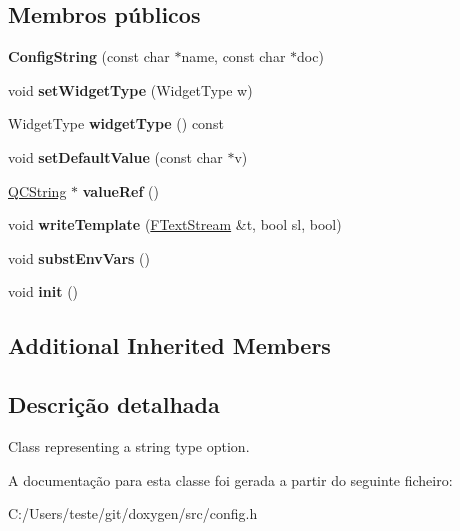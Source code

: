 \subsection*{Membros públicos}
\begin{DoxyCompactItemize}
\item 
\hypertarget{class_config_string_af3cba8358c7cc00c53cfb032b847bff2}{{\bfseries Config\-String} (const char $\ast$name, const char $\ast$doc)}\label{class_config_string_af3cba8358c7cc00c53cfb032b847bff2}

\item 
\hypertarget{class_config_string_aefd9d316a5af38db88268212736d35a2}{void {\bfseries set\-Widget\-Type} (Widget\-Type w)}\label{class_config_string_aefd9d316a5af38db88268212736d35a2}

\item 
\hypertarget{class_config_string_a28a506144c8747cb26dffbfb11e63ee5}{Widget\-Type {\bfseries widget\-Type} () const }\label{class_config_string_a28a506144c8747cb26dffbfb11e63ee5}

\item 
\hypertarget{class_config_string_a75a19d6f32950fe626410d51f8be1fa7}{void {\bfseries set\-Default\-Value} (const char $\ast$v)}\label{class_config_string_a75a19d6f32950fe626410d51f8be1fa7}

\item 
\hypertarget{class_config_string_a9c4fe5ca500670ba901c995ab38ec6c9}{\hyperlink{class_q_c_string}{Q\-C\-String} $\ast$ {\bfseries value\-Ref} ()}\label{class_config_string_a9c4fe5ca500670ba901c995ab38ec6c9}

\item 
\hypertarget{class_config_string_ad532b92c9971149d194403dff3458ba7}{void {\bfseries write\-Template} (\hyperlink{class_f_text_stream}{F\-Text\-Stream} \&t, bool sl, bool)}\label{class_config_string_ad532b92c9971149d194403dff3458ba7}

\item 
\hypertarget{class_config_string_a79866440425087f224d4f77311efad6a}{void {\bfseries subst\-Env\-Vars} ()}\label{class_config_string_a79866440425087f224d4f77311efad6a}

\item 
\hypertarget{class_config_string_a02fd73d861ef2e4aabb38c0c9ff82947}{void {\bfseries init} ()}\label{class_config_string_a02fd73d861ef2e4aabb38c0c9ff82947}

\end{DoxyCompactItemize}
\subsection*{Additional Inherited Members}


\subsection{Descrição detalhada}
Class representing a string type option. 

A documentação para esta classe foi gerada a partir do seguinte ficheiro\-:\begin{DoxyCompactItemize}
\item 
C\-:/\-Users/teste/git/doxygen/src/config.\-h\end{DoxyCompactItemize}
